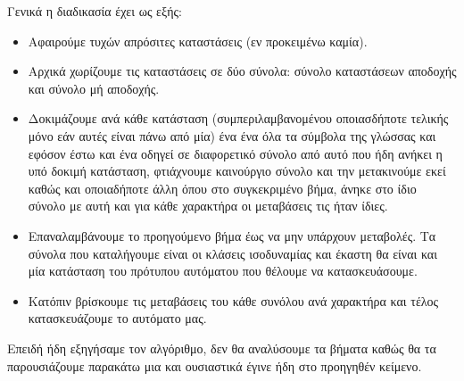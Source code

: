 \begin{comment}
	\end{tikzpicture}
\end{figure}
\end{comment}

Γενικά η διαδικασία έχει ως εξής:
\reducevspace\reducevspace\reducevspace\reducevspace\reducevspace\reducevspace
\reducevspace\reducevspace\reducevspace\reducevspace\reducevspace\reducevspace
\begin{itemize}
	\itemsep0em

	\item Αφαιρούμε τυχών απρόσιτες καταστάσεις (εν προκειμένω καμία).

	\item Αρχικά χωρίζουμε τις καταστάσεις σε δύο σύνολα: σύνολο καταστάσεων αποδοχής και σύνολο μή αποδοχής.

	\item Δοκιμάζουμε ανά κάθε κατάσταση (συμπεριλαμβανομένου οποιασδήποτε τελικής μόνο εάν αυτές είναι πάνω από
	μία) ένα ένα
	όλα τα σύμβολα της γλώσσας και εφόσον έστω και ένα οδηγεί σε διαφορετικό σύνολο από αυτό που ήδη ανήκει η υπό
	δοκιμή κατάσταση, φτιάχνουμε καινούργιο σύνολο και την μετακινούμε εκεί καθώς και οποιαδήποτε άλλη όπου στο
	συγκεκριμένο βήμα, άνηκε στο ίδιο σύνολο με αυτή και για κάθε χαρακτήρα οι μεταβάσεις τις ήταν ίδιες.

	\item Επαναλαμβάνουμε το προηγούμενο βήμα έως να μην υπάρχουν μεταβολές. Τα σύνολα που καταλήγουμε
	είναι οι κλάσεις ισοδυναμίας και έκαστη θα είναι και μία κατάσταση του πρότυπου αυτόματου που
	θέλουμε να κατασκευάσουμε.

	\item Κατόπιν βρίσκουμε τις μεταβάσεις του κάθε συνόλου ανά χαρακτήρα και τέλος κατασκευάζουμε το αυτόματο μας.
\end{itemize}
\reducevspace\reducevspace\reducevspace\reducevspace\reducevspace\reducevspace
\reducevspace\reducevspace\reducevspace\reducevspace\reducevspace\reducevspace
Επειδή ήδη εξηγήσαμε τον αλγόριθμο, δεν θα αναλύσουμε τα βήματα καθώς θα τα παρουσιάζουμε παρακάτω μια και
ουσιαστικά
έγινε ήδη στο προηγηθέν κείμενο.




\clearpage

\setlength{\arrayrulewidth}{0.5mm}
\setlength{\tabcolsep}{18pt}
\renewcommand{\arraystretch}{1}


